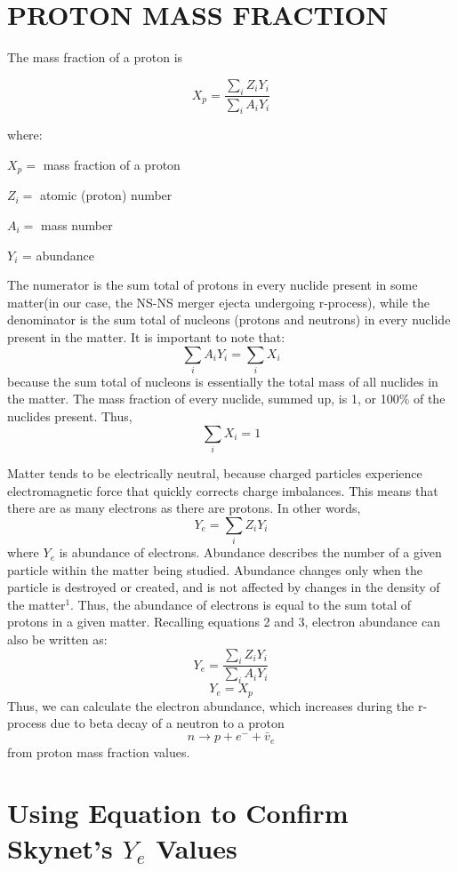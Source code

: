 \documentclass[11pt, letterpaper]{article}
\begin{document}
\section{PROTON MASS FRACTION}

The mass fraction of a proton is

\begin{equation} 
X_p = \frac{\sum_{i}Z_iY_i}{\sum_{i}A_iY_i} 
\end{equation}

where:
\begin{multicols}{2}
\begin{center}

$X_p =$ mass fraction of a proton

$Z_i =$ atomic (proton) number

\columnbreak

$A_i =$ mass number

$Y_i$ = abundance

\end{center}
\end{multicols}

\indent The numerator is the sum total of protons in every nuclide present in some matter(in our case, the NS-NS merger ejecta undergoing r-process), while the denominator is the sum total of nucleons (protons and neutrons) in every nuclide present in the matter. It is important to note that: 
\begin{equation} 
\sum_{i}A_iY_i = \sum_{i}X_i
\end{equation}
because the sum total of nucleons is essentially the total mass of all nuclides in the matter. The mass fraction of every nuclide, summed up, is 1, or 100\% of the nuclides present. Thus, 
\begin{equation} 
\sum_{i}X_i = 1
\end{equation}

\indent Matter tends to be electrically neutral, because charged particles experience electromagnetic force that quickly corrects charge imbalances. This means that there are as many electrons as there are protons. In other words, 
\begin{equation} 
Y_e = \sum_{i}Z_iY_i
\end{equation}
where $Y_e$ is abundance of electrons. Abundance describes the number of a given particle within the matter being studied. Abundance changes only when the particle is destroyed or created, and is not affected by changes in the density of the matter$^{1}$. Thus, the abundance of electrons is equal to the sum total of protons in a given matter. Recalling equations 2 and 3, electron abundance can also be written as: 
\begin{equation} 
Y_e = \frac{\sum_{i}Z_iY_i}{\sum_{i}A_iY_i}
\end{equation}
\begin{equation} 
Y_e = X_p
\end{equation}
Thus, we can calculate the electron abundance, which increases during the r-process due to beta decay of a neutron to a proton \[n \rightarrow p + e^- + \bar v_e\] from proton mass fraction values.

\section{Using Equation to Confirm Skynet's $Y_e$ Values}
\end{document}
